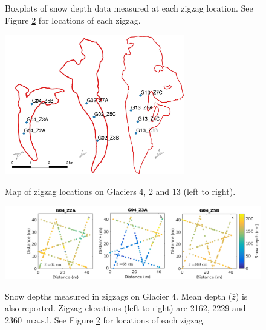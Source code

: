 \documentclass{sfuthesis}
\begin{document}
\begin{figure}[H]
	\centering
	\caption[Boxplots of snow depth data measured at each zigzag location]{Boxplots of snow depth data measured at each zigzag location. See Figure \ref{fig:ZZ_locations} for locations of each zigzag.}
	\label{fig:ZZ_boxplot}
\end{figure}


\begin{figure}[H]
	\centering
	\includegraphics[width = 0.7\textwidth]{map_zigzaglocation_all.jpeg}\\
	\caption[Map of zigzag locations on Glaciers 4, 2 and 13]{Map of zigzag locations on Glaciers 4, 2 and 13 (left to right).}
	\label{fig:ZZ_locations}
\end{figure}

\begin{figure}[H]
	\centering
	\includegraphics[width = \textwidth]{ZigzagDepth_G04.png}\\
	\caption[Snow depths measured in zigzags on Glacier 4]{Snow depths measured in zigzags on Glacier 4. Mean depth ($\bar{z}$) is also reported. Zigzag elevations (left to right) are 2162, 2229 and 2360 \,m\,a.s.l. See Figure \ref{fig:ZZ_locations} for locations of each zigzag.}
	\label{fig:ZZ_G04}
\end{figure}
\end{document}
